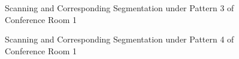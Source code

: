 \documentclass[11pt, a4paper,oneside,chapterprefix=false]{scrbook}
\begin{document}
\begin{figure}[H]
    \centering
      \label{fig:conf1 2 occluded} \hfill
     \label{fig:conf1 2 seg}
    \caption{Scanning and Corresponding Segmentation under Pattern 3 of Conference Room 1}
    \label{fig:conf1 2 occ and seg}
\end{figure}

\vspace{80pt}

\begin{figure}[H]
    \centering
      \label{fig:conf1 4 occluded} \hfill
     \label{fig:conf1 4 seg}
    \caption{Scanning and Corresponding Segmentation under Pattern 4 of Conference Room 1}
    \label{fig:conf1 4 occ and seg}
\end{figure}
\end{document}
